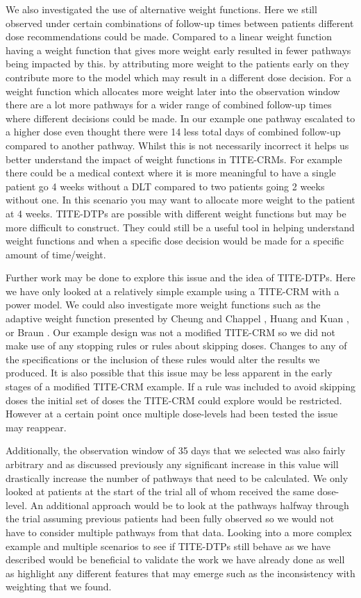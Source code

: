 We also investigated the use of alternative weight functions. Here we still observed under certain combinations of follow-up times between patients different dose recommendations could be made. Compared to a linear weight function having a weight function that gives more weight early resulted in fewer pathways being impacted by this. by attributing more weight to the patients early on they contribute more to the model which may result in a different dose decision. For a weight function which allocates more weight later into the observation window there are a lot more pathways for a wider range of combined follow-up times where different decisions could be made. In our example one pathway escalated to a higher dose even thought there were 14 less total days of combined follow-up compared to another pathway. Whilst this is not necessarily incorrect it helps us better understand the impact of weight functions in TITE-CRMs. For example there could be a medical context where it is more meaningful to have a single patient go 4 weeks without a DLT compared to two patients going 2 weeks without one. In this scenario you may want to allocate more weight to the patient at 4 weeks. TITE-DTPs are possible with different weight functions but may be more difficult to construct. They could still be a useful tool in helping understand weight functions and when a specific dose decision would be made for a specific amount of time/weight. 

Further work may be done to explore this issue and the idea of TITE-DTPs. Here we have only looked at a relatively simple example using a TITE-CRM with a power model. We could also investigate more weight functions such as the adaptive weight function presented by Cheung and Chappel \cite{cheungSequentialDesignsPhase2000}, Huang and Kuan \cite{huangTimetoeventContinualReassessment2014}, or Braun \cite{braunGeneralizingTITECRMAdapt2006}. Our example design was not a modified TITE-CRM so we did not make use of any stopping rules or rules about skipping doses. Changes to any of the specifications or the inclusion of these rules would alter the results we produced. It is also possible that this issue may be less apparent in the early stages of a modified TITE-CRM example. If a rule was included to avoid skipping doses the initial set of doses the TITE-CRM could explore would be restricted. However at a certain point once multiple dose-levels had been tested the issue may reappear.

Additionally, the observation window of 35 days that we selected was also fairly arbitrary and as discussed previously any significant increase in this value will drastically increase the number of pathways that need to be calculated. We only looked at patients at the start of the trial all of whom received the same dose-level. An additional approach would be to look at the pathways halfway through the trial assuming previous patients had been fully observed so we would not have to consider multiple pathways from that data. Looking into a more complex example and multiple scenarios to see if TITE-DTPs still behave as we have described would be beneficial to validate the work we have already done as well as highlight any different features that may emerge such as the inconsistency with weighting that we found.


